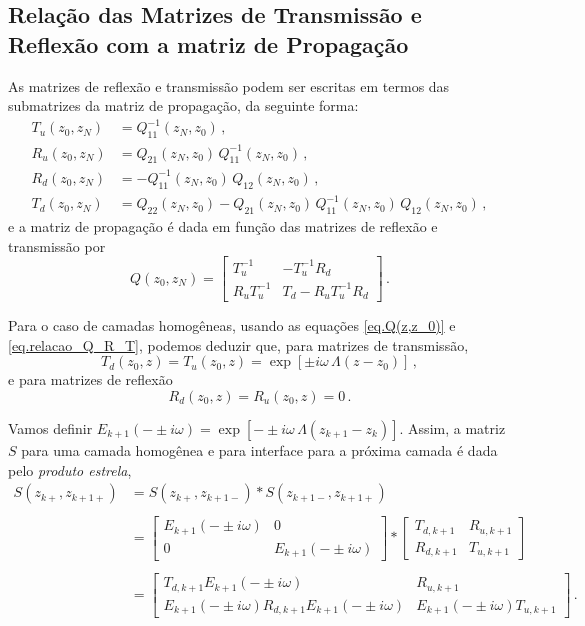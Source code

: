 \subsection{Rela\c{c}\~ao das Matrizes de Transmiss\~ao e Reflex\~ao com a matriz de Propaga\c{c}\~ao}

As matrizes de reflex\~ao e transmiss\~ao podem ser escritas em termos das submatrizes da matriz de propaga\c{c}\~ao, da seguinte forma:
\begin{align}\nonumber
T_u(z_0,z_N)&=Q_{11}^{-1}(z_N,z_0)\,,\\\nonumber
R_u(z_0,z_N)&=Q_{21}(z_N,z_0)\,Q_{11}^{-1}(z_N,z_0)\,,\\\label{eq.relacao_Q_R_T}
R_d(z_0,z_N)&=-Q_{11}^{-1}(z_N,z_0)\,Q_{12}(z_N,z_0)\,,\\\nonumber
T_d(z_0,z_N)&=Q_{22}(z_N,z_0)-Q_{21}(z_N,z_0)\,Q_{11}^{-1}(z_N,z_0)\,Q_{12}(z_N,z_0)\,,
\end{align}
e a matriz de propaga\c{c}\~ao \'e dada em fun\c{c}\~ao das matrizes de reflex\~ao e transmiss\~ao por
\begin{equation*}
Q(z_0,z_N)=
\begin{bmatrix}
T_u^{-1}&-T_u^{-1}R_d\\
R_uT_u^{-1}&T_d-R_uT_u^{-1}R_d
\end{bmatrix}\,.
\end{equation*}


Para o caso de camadas homog\^eneas, usando as equa\c{c}\~oes \ref{eq.Q(z,z_0)} e \ref{eq.relacao_Q_R_T}, podemos deduzir que, para matrizes de transmiss\~ao,
\begin{equation*}
T_d(z_0,z)=T_u(z_0,z)=\exp\left[\pm i\omega\,\Lambda(z-z_0)\right]\,,
\end{equation*}
e para matrizes de reflex\~ao
\begin{equation*}
R_d(z_0,z)=R_u(z_0,z)=0\,.
\end{equation*}

Vamos definir $E_{k+1}(-\pm i\omega)=\exp\left[-\pm i\omega\,\Lambda(z_{k+1}-z_k)\right]$. Assim, a matriz $S$ para uma camada homog\^enea e para interface para a pr\'oxima camada \'e dada pelo \textit{produto estrela},
\begin{align*}
S(z_{k+},z_{k+1+})&=S(z_{k+},z_{k+1-})*S(z_{k+1-},z_{k+1+})\\\\
&=
\begin{bmatrix}
E_{k+1}(-\pm i\omega)&0\\
0&E_{k+1}(-\pm i\omega)
\end{bmatrix}
*
\begin{bmatrix}
T_{d,k+1}&R_{u,k+1}\\
R_{d,k+1}&T_{u,k+1}
\end{bmatrix}\\\\
&=
\begin{bmatrix}
T_{d,k+1}E_{k+1}(-\pm i\omega)&R_{u,k+1}\\
E_{k+1}(-\pm i\omega)R_{d,k+1}E_{k+1}(-\pm i\omega)&E_{k+1}(-\pm i\omega)T_{u,k+1}
\end{bmatrix}\,.
\end{align*}